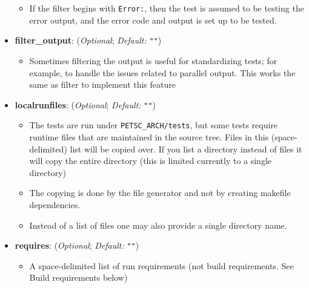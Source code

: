\begin{itemize}
\begin{itemize}
      \item If the filter begins with \lstinline{Error:}, then the test is
            assumed to be testing the error output, and the error code and
            output is set up to be tested.

      \end{itemize}

    \item[]  \textbf{filter\_output}: (\emph{Optional}; \emph{Default:} \lstinline{""})

      \begin{itemize}

      \item Sometimes filtering the output is useful for standardizing
            tests; for example, to handle the issues related to parallel
            output.  This works the same as filter to implement this
            feature

      \end{itemize}

    \item[]  \textbf{localrunfiles}: (\emph{Optional}; \emph{Default:} \lstinline{""})

      \begin{itemize}

      \item The tests are run under \lstinline{PETSC_ARCH/tests}, but
            some tests require runtime files that are maintained in the
            source tree.  Files in this (space-delimited) list will be
            copied over. If you list a directory instead of files it will copy the
            entire directory (this is limited currently to a single directory)

      \item The copying is done by the file generator and not by
            creating makefile dependencies.

      \item Instead of a list of files one may also provide a single directory name.

      \end{itemize}

    \item[]  \textbf{requires}: (\emph{Optional}; \emph{Default:} \lstinline{""})
      \begin{itemize}

        \item A space-delimited list of run requirements (not
        build requirements. See Build requirements below)


\end{itemize}
\end{itemize}

